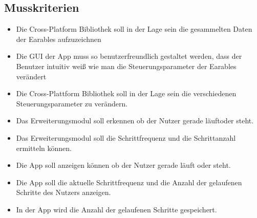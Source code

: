 \documentclass[a4paper,12pt]{article}
\begin{document}
\subsection{Musskriterien}

  \begin{itemize}
    \item Die \Gls{Cross-Platform Bibliothek} soll in der Lage sein die gesammelten Daten der \Gls{Earables} aufzuzeichnen
    \item Die \Gls{GUI} der App muss so benutzerfreundlich gestaltet werden, dass der Benutzer intuitiv weiß wie man die \Gls{Steuerungsparameter} der \Gls{Earables} verändert
    \item Die Cross-Plattform Bibliothek soll in der Lage sein die verschiedenen \Gls{Steuerungsparameter} zu verändern.
    \item Das Erweiterungsmodul soll erkennen ob der Nutzer gerade \glqq läuft\grqq{}oder \glqq steht\grqq.
    \item Das Erweiterungsmodul soll die \gls{Schrittfrequenz} und die Schrittanzahl ermitteln können.
    \item Die App soll anzeigen können ob der Nutzer gerade läuft oder steht.
    \item Die App soll die aktuelle Schrittfrequenz und die Anzahl der gelaufenen Schritte des Nutzers anzeigen.
    \item In der App wird die Anzahl der gelaufenen Schritte gespeichert.
  \end{itemize}
\end{document}
